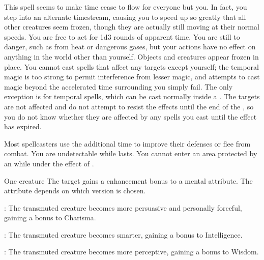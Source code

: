 \begin{spellheader}
\end{spellheader}
\begin{spelleffects}
    \spelleffect This spell seems to make time cease to flow for everyone but you. In fact, you step into an alternate timestream, causing you to speed up so greatly that all other creatures seem frozen, though they are actually still moving at their normal speeds. You are free to act for 1d3 rounds of apparent time. You are still \vulnerable to danger, such as from heat or dangerous gases, but your actions have no effect on anything in the world other than yourself. Objects and creatures appear frozen in place. You cannot cast spells that affect any targets except yourself; the temporal magic is too strong to permit interference from lesser magic, and attempts to cast magic beyond the accelerated time surrounding you simply fail. The only exception is for temporal spells, which can be cast normally inside a . The targets are not affected and do not attempt to resist the effects until the end of the , so you do not know whether they are affected by any spells you cast until the effect has expired.
\end{spelleffects}
\begin{spellfooter}
    \spellnotes Most spellcasters use the additional time to improve their defenses or flee from combat. You are undetectable while  lasts. You cannot enter an area protected by an  while under the effect of .
\end{spellfooter}

\begin{spellheader}
    \spellrng{\rngtouch}
    \spelldur{\durshort}
\end{spellheader}
\begin{spelleffects}
    \begin{spelltarget}{One creature}
        \spelleffect The target gains a  enhancement bonus to a mental attribute. The attribute depends on which version is chosen.
        \par {}: The transmuted creature becomes more persuasive and personally forceful, gaining a bonus to Charisma.
        \par {}: The transmuted creature becomes smarter, gaining a bonus to Intelligence.
        \par {}: The transmuted creature becomes more perceptive, gaining a bonus to Wisdom.
    \end{spelltarget}
\end{spelleffects}
\begin{spellfooter}
    
\end{spellfooter}

